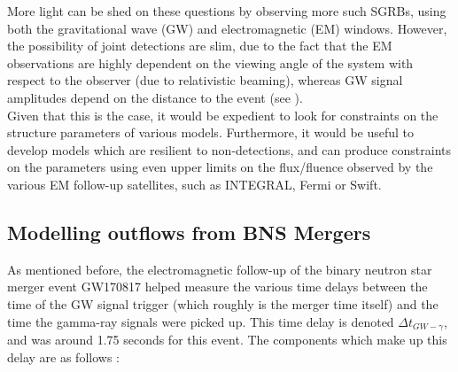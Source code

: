     More light can be shed on these questions by observing more such SGRBs, using both
    the gravitational wave (GW) and electromagnetic (EM) windows.  However, the
    possibility of joint detections are slim, due to the fact that the EM observations
    are highly dependent on the viewing angle of the system with respect to the observer
    (due to relativistic beaming), whereas GW signal amplitudes depend on the distance
    to the event (see \cite{saleem_2020a}).\\
    Given that this is the case, it would be expedient to look for constraints on the
    structure parameters of various models.  Furthermore, it would be useful to develop
    models which are resilient to non-detections, and can produce constraints on the
    parameters using even upper limits on the flux/fluence observed by the various EM
    follow-up satellites, such as INTEGRAL, Fermi or Swift.\\

    \subsection{Modelling outflows from BNS Mergers}\label{ssec:bns-outflows}

    As mentioned before, the electromagnetic follow-up of the binary neutron star merger
    event GW170817 helped measure the various time delays between the time of the GW
    signal trigger (which roughly is the merger time itself) and the time the gamma-ray
    signals were picked up. This time delay is denoted $\Delta t_{GW-\gamma}$, and was
    around 1.75 seconds for this event.  The components which make up this delay are as
    follows \cite{lazzati_2020}:

